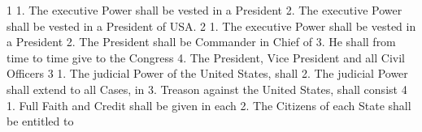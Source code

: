 1
1. The executive Power shall be vested in a President
2. The executive Power shall be vested in a President of USA.
2
1. The executive Power shall be vested in a President
2. The President shall be Commander in Chief of
3. He shall from time to time give to the Congress
4. The President, Vice President and all Civil Officers
3
1. The judicial Power of the United States, shall
2. The judicial Power shall extend to all Cases, in
3. Treason against the United States, shall consist
4
1. Full Faith and Credit shall be given in each
2. The Citizens of each State shall be entitled to
